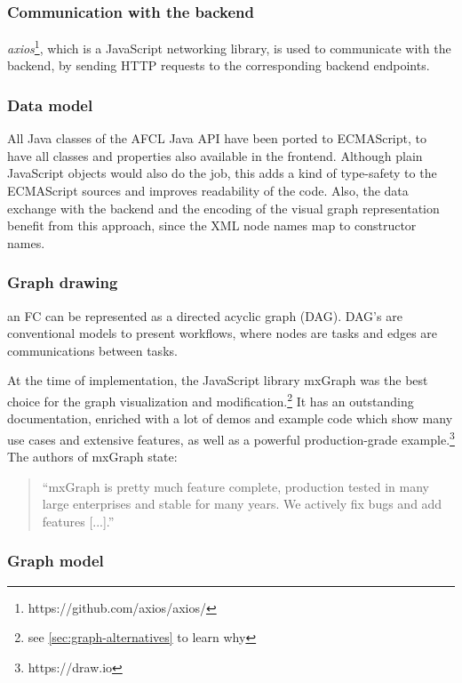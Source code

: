 \documentclass[a4paper,top=25mm,bottom=25mm,12pt,pdftex,halfparskip,twoside,openany,bibtotoc,numbers=noenddot]{scrbook}
\begin{document}
\subsubsection{Communication with the backend}
\textit{axios}\footnote{https://github.com/axios/axios/}, which is a JavaScript networking library, is used to communicate with the backend, by sending HTTP requests to the corresponding backend endpoints.

\subsubsection{Data model}

All Java classes of the AFCL Java API \citep{online-afcl-dps} have been ported to ECMAScript, to have all classes and properties also available in the frontend. Although plain JavaScript objects would also do the job, this adds a kind of type-safety to the ECMAScript sources and improves readability of the code. Also, the data exchange with the backend and the encoding of the visual graph representation benefit from this approach, since the XML node names map to constructor names.

\subsubsection{Graph drawing}

an FC can be represented as a directed acyclic graph (DAG). DAG's are conventional models to present workflows, where nodes are tasks and edges are communications between tasks.

At the time of implementation, the JavaScript library mxGraph was the best choice for the graph visualization and modification.\footnote{see \ref{sec:graph-alternatives} to learn why}
It has an outstanding documentation, enriched with a lot of demos and example code which show many use cases and extensive features, as well as a powerful production-grade example.\footnote{https://draw.io}\\
The authors of mxGraph state:\\
\begin{quote}
``mxGraph is pretty much feature complete, production tested in many large enterprises and stable for many years. We actively fix bugs and add features [...].''
\end{quote}

\subsubsection{Graph model}
\end{document}
